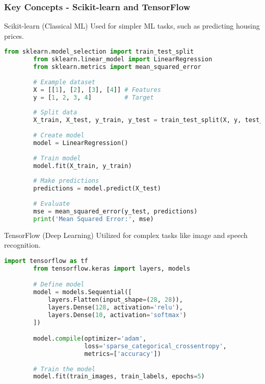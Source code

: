 \documentclass{beamer}
\begin{document}
\begin{frame}[fragile]
    \frametitle{Key Concepts - Scikit-learn and TensorFlow}

    \begin{block}{Scikit-learn (Classical ML)}
        Used for simpler ML tasks, such as predicting housing prices.
        \begin{lstlisting}[language=Python]
        from sklearn.model_selection import train_test_split
        from sklearn.linear_model import LinearRegression
        from sklearn.metrics import mean_squared_error
        
        # Example dataset
        X = [[1], [2], [3], [4]] # Features
        y = [1, 2, 3, 4]         # Target
        
        # Split data
        X_train, X_test, y_train, y_test = train_test_split(X, y, test_size=0.2)
        
        # Create model
        model = LinearRegression()
        
        # Train model
        model.fit(X_train, y_train)
        
        # Make predictions
        predictions = model.predict(X_test)
        
        # Evaluate
        mse = mean_squared_error(y_test, predictions)
        print('Mean Squared Error:', mse)
        \end{lstlisting}
    \end{block}

    \begin{block}{TensorFlow (Deep Learning)}
        Utilized for complex tasks like image and speech recognition.
        \begin{lstlisting}[language=Python]
        import tensorflow as tf
        from tensorflow.keras import layers, models

        # Define model
        model = models.Sequential([
            layers.Flatten(input_shape=(28, 28)),
            layers.Dense(128, activation='relu'),
            layers.Dense(10, activation='softmax')
        ])

        model.compile(optimizer='adam',
                      loss='sparse_categorical_crossentropy',
                      metrics=['accuracy'])
        
        # Train the model
        model.fit(train_images, train_labels, epochs=5)
        \end{lstlisting}
    \end{block}
\end{frame}
\end{document}
